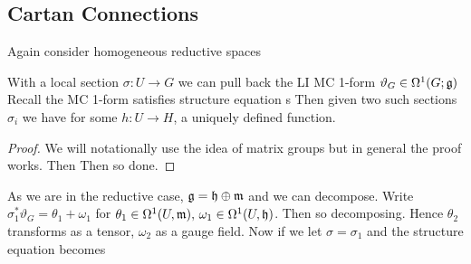 \documentclass{article}
\begin{document}
\subsection{Cartan Connections}
Again consider homogeneous reductive spaces 
\begin{center}
\end{center}
With a local section $\sigma : U \to G$ we can pull back the LI MC 1-form $\vartheta_G \in \Omega^1(G;\mathfrak{g})$
Recall the MC 1-form satisfies structure equation s
Then given two such sections $\sigma_i$ we have 
for some $h:U \to H$, a uniquely defined function. 
\begin{lemma}
\end{lemma}
\begin{proof}
	We will notationally use the idea of matrix groups but in general the proof works. Then 
	Then 
	so done. 
\end{proof}
As we are in the reductive case, $\mathfrak{g} = \mathfrak{h} \oplus \mathfrak{m}$ and we can decompose. Write $\sigma_1^\ast \vartheta_G = \theta_1 + \omega_1 $ for $\theta_1 \in \Omega^1(U,\mathfrak{m}), \, \omega_1 \in \Omega^1(U,\mathfrak{h})$. Then 
so 
decomposing. Hence $\theta_2$ transforms as a tensor, $\omega_2$ as a gauge field. Now if we let $\sigma = \sigma_1$ and the structure equation becomes 
\end{document}
